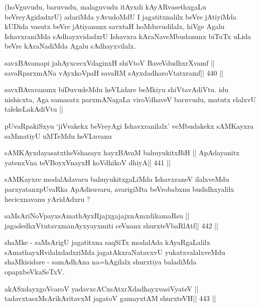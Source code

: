 \begin{artha}
(hoVguvudu, baruvudu, malaguvudu itAyxdi kAyARvasethxgaLu
  beVreyAgidadxrU) adariMda yAvudoMdU I jagatitxnalilx beVre jAtiyiMda
  kUDida vasutx beVre jAtiyanunx savxtaH hoMduvudilalx, hiVge Agalu
  IshavxraniMda sAdhayxvidadxrU Ishavxra kAraNaveMbudanunx biTuTx
  uLida beVre kAraNadiMda Agalu sAdhayxvilalx.
\end{artha}


\begin{shl}
savxBAvamapi ja{hAyx}cecxVdaginxH shiVtoV BaveVdudhxrXvamf ||
savaRparxmANa vAyxkoVpaH savaRM sAyxdadharoVtatxramf\hfill || 440 ||
\end{shl}

\begin{artha}
savxBAvavanunx biDuvudeMdu heVLidare beMkiyu
shiVtavAdiVtu. idu nishicxta, Aga samasatx parxmANagaLa viroVdhaveV
baruvudu, matutx elalxvU talekeLakAdiVtu ||
\end{artha}

\begin{artha}
pUvaRpakiSxyu `jiVvakekx beVreyAgi Ishavxranilalx' veMbudakekx
sAMKayxra saMmatiyU uMTeMdu heVLuvanu
\end{artha}

\begin{shl}
sAMKAyxdayasatxtheVshasayx hayxBAvaM bahuyukitxBiH ||
ApAdayanitx yatenxVna teVBoyxV\s nayxH koV\s dhikoV dhiyA\hfill || 441 ||
\end{shl}

\begin{artha}
sAMKayxre modalAdavaru bahuyukitxgaLiMda IshavxraneV ilalxveMdu
parxyatanxpUvaRka ApAdisuvaru, avarigiMta beVrobabxnu budidhxyalilx
hecicxnavanu yAridAdxru ?
\end{artha}


\begin{shl}
saMsAriNoV\s payxsAmathAyxRjajxgajajxnAmxdikamaRsu ||
jagadedhxVtutavxmanAyxyayxmiti ceVnanx shurxteVbaRlAtf\hfill || 442 ||
\end{shl}

\begin{artha}
shaMke - saMsArigU jagatitxna saqSiTx modalAda kAyaRgaLalilx
sAmathayxRvilalxdadxriMda jagatAkxraNatavxvU yukatxvalalxveMdu
shaMkisidare - samAdhAna na=hAgilalx shurxtiya baladiMda 
opapxbeVkaSeTxV.
\end{artha}

\begin{shl}
akASxdayxgoVcaroV yadavxcACxsAtxrXdadhayxvasiVyateV ||
tadavxtasxMsArikAritavxM jagatoV gamayxtAM shurxteVH\hfill || 443 ||
\end{shl}

